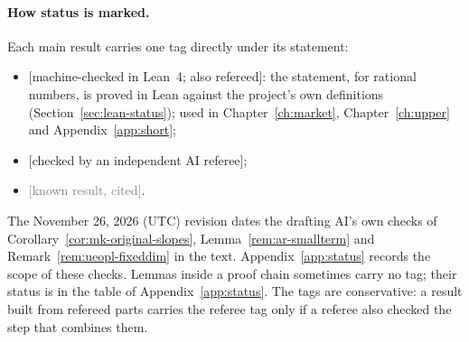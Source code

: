 \paragraph{How status is marked.} Each main result carries one tag directly under its statement:
\begin{itemize}[nosep]
\item \textcolor{vlean}{\small\textsf{[machine-checked in Lean~4; also refereed]}}: the statement, for rational numbers, is proved in Lean against the project's own definitions (Section~\ref{sec:lean-status}); used in Chapter~\ref{ch:market}, Chapter~\ref{ch:upper} and Appendix~\ref{app:short};
\item \textcolor{vref}{\small\textsf{[checked by an independent AI referee]}};
\item \textcolor{gray}{\small\textsf{[known result, cited]}}.
\end{itemize}
The November 26, 2026 (UTC) revision dates the drafting AI's own
checks of Corollary~\ref{cor:mk-original-slopes},
Lemma~\ref{rem:ar-smallterm} and Remark~\ref{rem:ueopl-fixeddim} in
the text. Appendix~\ref{app:status} records the scope of these checks.
Lemmas inside a proof chain sometimes carry no tag; their status is in the table of
Appendix~\ref{app:status}. The tags are conservative: a result built from refereed parts carries the referee tag only if a referee also checked the step that combines them.

